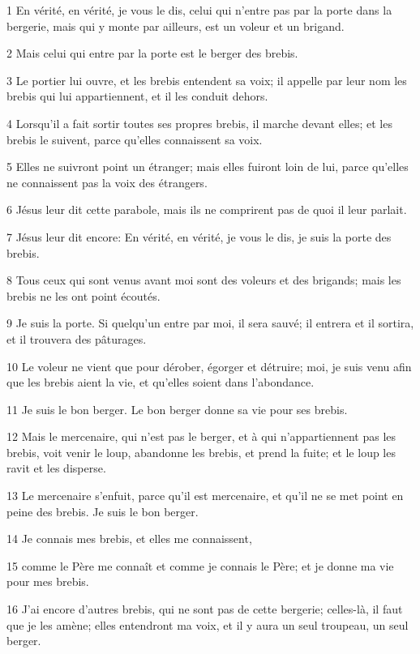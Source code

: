 \par 1 En vérité, en vérité, je vous le dis, celui qui n'entre pas par la porte dans la bergerie, mais qui y monte par ailleurs, est un voleur et un brigand.
\par 2 Mais celui qui entre par la porte est le berger des brebis.
\par 3 Le portier lui ouvre, et les brebis entendent sa voix; il appelle par leur nom les brebis qui lui appartiennent, et il les conduit dehors.
\par 4 Lorsqu'il a fait sortir toutes ses propres brebis, il marche devant elles; et les brebis le suivent, parce qu'elles connaissent sa voix.
\par 5 Elles ne suivront point un étranger; mais elles fuiront loin de lui, parce qu'elles ne connaissent pas la voix des étrangers.
\par 6 Jésus leur dit cette parabole, mais ils ne comprirent pas de quoi il leur parlait.
\par 7 Jésus leur dit encore: En vérité, en vérité, je vous le dis, je suis la porte des brebis.
\par 8 Tous ceux qui sont venus avant moi sont des voleurs et des brigands; mais les brebis ne les ont point écoutés.
\par 9 Je suis la porte. Si quelqu'un entre par moi, il sera sauvé; il entrera et il sortira, et il trouvera des pâturages.
\par 10 Le voleur ne vient que pour dérober, égorger et détruire; moi, je suis venu afin que les brebis aient la vie, et qu'elles soient dans l'abondance.
\par 11 Je suis le bon berger. Le bon berger donne sa vie pour ses brebis.
\par 12 Mais le mercenaire, qui n'est pas le berger, et à qui n'appartiennent pas les brebis, voit venir le loup, abandonne les brebis, et prend la fuite; et le loup les ravit et les disperse.
\par 13 Le mercenaire s'enfuit, parce qu'il est mercenaire, et qu'il ne se met point en peine des brebis. Je suis le bon berger.
\par 14 Je connais mes brebis, et elles me connaissent,
\par 15 comme le Père me connaît et comme je connais le Père; et je donne ma vie pour mes brebis.
\par 16 J'ai encore d'autres brebis, qui ne sont pas de cette bergerie; celles-là, il faut que je les amène; elles entendront ma voix, et il y aura un seul troupeau, un seul berger.
